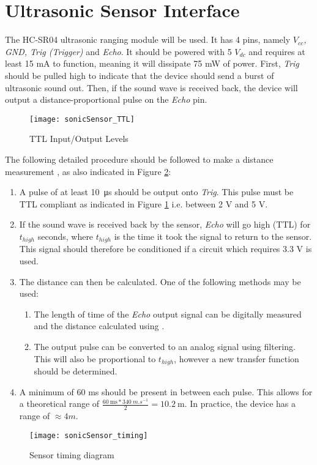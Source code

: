 \graphicspath{{content/1_literatureReview/figures/}}
\section{Ultrasonic Sensor Interface}\label{sec:ultrasonicSensorInterface}

The HC-SR04 ultrasonic ranging module will be used. It has 4 pins, namely \textit{$V_{cc}$, GND, Trig (Trigger)} and \textit{Echo}.
It should be powered with 5 ${V_{dc}}$ and requires at least 15 mA to function, meaning it will dissipate 75 mW of power. 
First, \textit{Trig} should be pulled high to indicate that the device should send a burst of ultrasonic sound out.
Then, if the sound wave is received back, the device will output a distance-proportional pulse on the \textit{Echo} pin.

\begin{figure}[!htb]
  \centering
  \texttt{[image: sonicSensor\_TTL]}
  \caption{TTL Input/Output Levels \cite{ttlLevels}}
  \label{fig:sonicSensor_TTL}
\end{figure}

The following detailed procedure should be followed to make a distance measurement \cite{datasheetHCSR04}, as also indicated in Figure \ref{fig:sonicSensor_timing}:
\begin{enumerate}
    \item A pulse of at least \SI{10}{\micro\second} should be output onto \textit{Trig}. This pulse must be TTL compliant as indicated
    in Figure \ref{fig:sonicSensor_TTL} i.e. between 2 V and 5 V.
    \item If the sound wave is received back by the sensor, \textit{Echo} will go high (TTL) for ${t_{high}}$ seconds, where ${t_{high}}$ is the time it took the signal to return to the sensor.
          This signal should therefore be conditioned if a circuit which requires 3.3 V is used.
    \item The distance can then be calculated. One of the following methods may be used:
    \begin{enumerate}
        \item The length of time of the \textit{Echo} output signal can be digitally measured and the distance calculated using  \cite{datasheetHCSR04}.
        \item The output pulse can be converted to an analog signal using filtering. This will also be proportional to $t_{high}$, however a new transfer function should be determined.
    \end{enumerate}
    \item A minimum of 60 ms should be present in between each pulse. This allows for a theoretical range of $\frac{\SI{60}{\milli\second} * \SI{340}{m.s^{-1}}}{2} = \SI{10.2}{\metre}$.
          In practice, the device has a range of $\approx 4 m$.
\end{enumerate}

\begin{figure}[!htb]
  \centering
  \texttt{[image: sonicSensor\_timing]}
  \caption{Sensor timing diagram \cite{datasheetHCSR04}}
  \label{fig:sonicSensor_timing}
\end{figure}